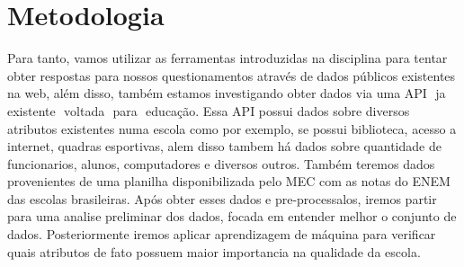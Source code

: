\documentclass[review]{elsarticle}
\begin{document}
\section{Metodologia}

Para tanto, vamos utilizar as ferramentas introduzidas na disciplina para
tentar obter respostas para nossos questionamentos através de dados públicos
existentes na web, além disso, também estamos investigando obter dados via uma
API​ ​ ja​ ​ existente​ ​ voltada​ ​ para​ ​ educação.
Essa API possui dados sobre diversos atributos existentes numa escola como por exemplo, se possui biblioteca, acesso a internet, quadras esportivas, alem disso tambem há dados sobre quantidade de funcionarios, alunos, computadores e diversos outros. 
Também teremos dados provenientes de uma planilha disponibilizada pelo MEC com as notas do ENEM das escolas brasileiras. Após obter esses dados e pre-processalos, iremos partir para uma analise preliminar dos dados, focada em entender melhor o conjunto de dados. Posteriormente iremos aplicar aprendizagem de máquina para verificar quais atributos de fato possuem maior importancia na qualidade da escola. 
\end{document}
